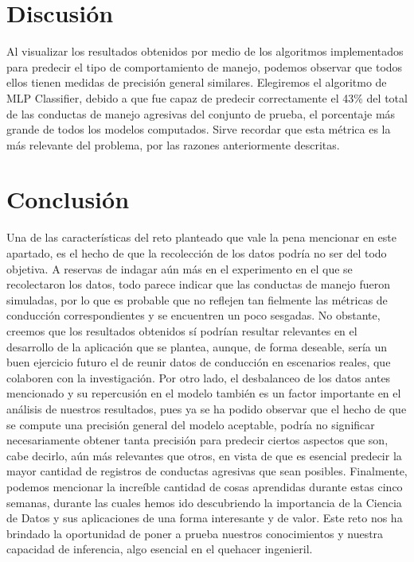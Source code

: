 \documentclass[runningheads]{llncs}
\begin{document}
\newpage

\section{Discusión}
    Al visualizar los resultados obtenidos por medio de los algoritmos implementados para predecir el tipo de comportamiento de manejo, podemos observar que todos ellos tienen medidas de precisión general similares. Elegiremos el algoritmo de MLP Classifier, debido a que fue capaz de predecir correctamente el 43\% del total de las conductas de manejo agresivas del conjunto de prueba, el porcentaje más grande de todos los modelos computados. Sirve recordar que esta métrica es la más relevante del problema, por las razones anteriormente descritas.

\newpage

\section{Conclusión}
Una de las características del reto planteado que vale la pena mencionar en este apartado, es el hecho de que la recolección de los datos podría no ser del todo objetiva. A reservas de indagar aún más en el experimento en el que se recolectaron los datos, todo parece indicar que las conductas de manejo fueron simuladas, por lo que es probable que no reflejen tan fielmente las métricas de conducción correspondientes y se encuentren un poco sesgadas. No obstante, creemos que los resultados obtenidos sí podrían resultar relevantes en el desarrollo de la aplicación que se plantea, aunque, de forma deseable, sería un buen ejercicio futuro el de reunir datos de conducción en escenarios reales, que colaboren con la investigación.
Por otro lado, el desbalanceo de los datos antes mencionado y su repercusión en el modelo también es un factor importante en el análisis de nuestros resultados, pues ya se ha podido observar que el hecho de que se compute una precisión general del modelo aceptable, podría no significar necesariamente obtener tanta precisión para predecir ciertos aspectos que son, cabe decirlo, aún más relevantes que otros, en vista de que es esencial predecir la mayor cantidad de registros de conductas agresivas que sean posibles.
Finalmente, podemos mencionar la increíble cantidad de cosas aprendidas durante estas cinco semanas, durante las cuales hemos ido descubriendo la importancia de la Ciencia de Datos y sus aplicaciones de una forma interesante y de valor. Este reto nos ha brindado la oportunidad de poner a prueba nuestros conocimientos y nuestra capacidad de inferencia, algo esencial en el quehacer ingenieril.
\end{document}
